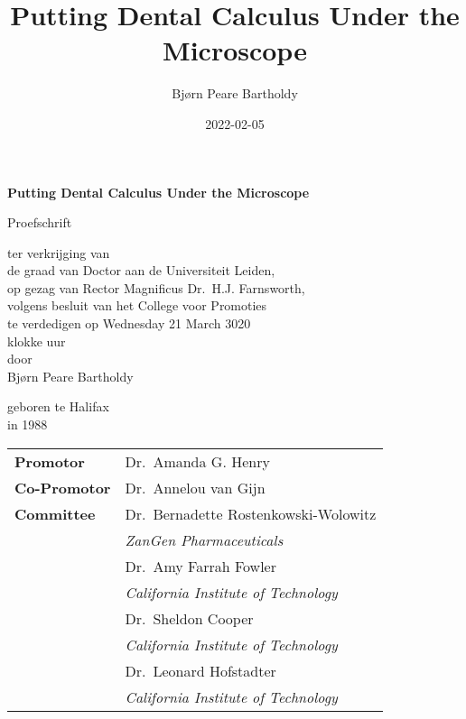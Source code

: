 \documentclass[
]{book}
\title{Putting Dental Calculus Under the Microscope}
\author{Bjørn Peare Bartholdy}
\date{2022-02-05}
\begin{document}
\clearpage
\thispagestyle{empty}
\begin{center}
\Huge\textbf{Putting Dental Calculus Under the Microscope}\par
\vspace{\baselineskip}
\huge\textit{}\par
\vfill %
    \Large{Proefschrift}\par
    \vspace{\baselineskip}
    \linespread{1.3}
    \large{ter verkrijging van \\
    de graad van Doctor aan de Universiteit Leiden, \\
    op gezag van Rector Magnificus Dr.~H.J. Farnsworth, \\
    volgens besluit van het College voor Promoties \\
    te verdedigen op Wednesday 21 March 3020 \\
    klokke  uur \\[1.5cm]
    door} \\[1.5cm]
    \Large{Bjørn Peare Bartholdy}\par
    \vspace{\baselineskip}
    \large{geboren te Halifax \\
    in 1988}
\end{center}

\clearpage
\thispagestyle{empty}

\noindent\begin{tabular}{p{8em} l}
    \large
    \textbf{Promotor}  & \large Dr.~Amanda G. Henry  \\ 
    \rule{0pt}{4ex}\large\textbf{Co-Promotor}  & \large Dr.~Annelou van Gijn  \\ 
    \large
    \rule{0pt}{8ex}\textbf{Committee}  & \rule{0pt}{4ex}\large Dr.~Bernadette Rostenkowski-Wolowitz  \\
    & \indent\textit{ZanGen Pharmaceuticals} \\  & \rule{0pt}{4ex}\large Dr.~Amy Farrah Fowler  \\
    & \indent\textit{California Institute of Technology} \\  & \rule{0pt}{4ex}\large Dr.~Sheldon Cooper  \\
    & \indent\textit{California Institute of Technology} \\  & \rule{0pt}{4ex}\large Dr.~Leonard Hofstadter  \\
    & \indent\textit{California Institute of Technology} \\ 
\end{tabular}
\end{document}
